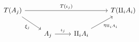 \begin{mainbox}{}
\begin{prop}
\begin{equation}\label{diagr 3 coproducts}
\begin{tikzcd}
T(A_j) \arrow[rrr, "T(\iota_j)"] \arrow[rd, "\xi_{j}"'] &                          &                                                & T(\amalg_i A_i) \\
                                                        & A_j \arrow[r, "\iota_j"] & \amalg_iA_i \arrow[ru, "\eta_{\amalg_i A_i}"'] &                
\end{tikzcd}
\end{equation}
\end{prop}
\end{mainbox}

